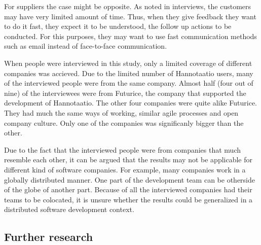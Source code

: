 \documentclass[english,12pt,a4paper,pdftex]{article}
\begin{document}
For suppliers the case might be opposite. As noted in interviews, the customers may have very limited amount of time. Thus, when they give feedback they want to do it fast, they expect it to be understood, the follow up actions to be conducted. For this purposes, they may want to use fast communication methods such as email instead of face-to-face communication.

When people were interviewed in this study, only a limited coverage of different companies was accieved. Due to the limited number of Hannotaatio users, many of the interviewed people were from the same company. Almost half (four out of nine) of the interviewees were from Futurice, the company that supported the development of Hannotaatio. The other four companies were quite alike Futurice. They had much the same ways of working, similar agile processes and open company culture. Only one of the companies was significanly bigger than the other.

Due to the fact that the interviewed people were from companies that much resemble each other, it can be argued that the results may not be applicable for different kind of software companies. For example, many companies work in a globally distributed manner. One part of the development team can be otherside of the globe of another part. Because of all the interviewed companies had their teams to be colocated, it is unsure whether the results could be generalized in a distributed software development context.

\subsection{Further research}
\end{document}
